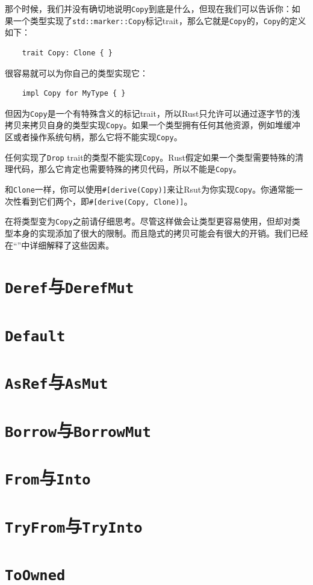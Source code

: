 那个时候，我们并没有确切地说明\texttt{Copy}到底是什么，但现在我们可以告诉你：如果一个类型实现了\texttt{std::marker::Copy}标记trait，那么它就是\texttt{Copy}的，\texttt{Copy}的定义如下：
\begin{verbatim}
    trait Copy: Clone { }
\end{verbatim}

很容易就可以为你自己的类型实现它：
\begin{verbatim}
    impl Copy for MyType { }
\end{verbatim}

但因为\texttt{Copy}是一个有特殊含义的标记trait，所以Rust只允许可以通过逐字节的浅拷贝来拷贝自身的类型实现\texttt{Copy}。如果一个类型拥有任何其他资源，例如堆缓冲区或者操作系统句柄，那么它将不能实现\texttt{Copy}。

任何实现了\texttt{Drop} trait的类型不能实现\texttt{Copy}。Rust假定如果一个类型需要特殊的清理代码，那么它肯定也需要特殊的拷贝代码，所以不能是\texttt{Copy}。

和\texttt{Clone}一样，你可以使用\texttt{\#[derive(Copy)]}来让Rsut为你实现\texttt{Copy}。你通常能一次性看到它们两个，即\texttt{\#[derive(Copy, Clone)]}。

在将类型变为\texttt{Copy}之前请仔细思考。尽管这样做会让类型更容易使用，但却对类型本身的实现添加了很大的限制。而且隐式的拷贝可能会有很大的开销。我们已经在“”中详细解释了这些因素。

\section{\texttt{Deref}与\texttt{DerefMut}}\label{deref}

\section{\texttt{Default}}\label{default}

\section{\texttt{AsRef}与\texttt{AsMut}}\label{asref}

\section{\texttt{Borrow}与\texttt{BorrowMut}}\label{borrow}

\section{\texttt{From}与\texttt{Into}}\label{from}

\section{\texttt{TryFrom}与\texttt{TryInto}}\label{tryfrom}

\section{\texttt{ToOwned}}\label{toowned}
